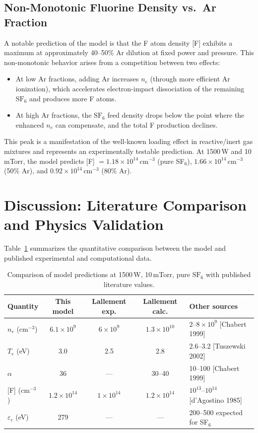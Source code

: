 \documentclass[11pt,a4paper]{article}
\newcommand{\SFsix}{\mathrm{SF}_6}
\newcommand{\Te}{T_e}
\newcommand{\nelec}{n_e}
\begin{document}
\subsection{Non-Monotonic Fluorine Density vs.\ Ar Fraction}

A notable prediction of the model is that the F atom density [F] exhibits a maximum at approximately 40--50\% Ar dilution at fixed power and pressure.  This non-monotonic behavior arises from a competition between two effects:
\begin{itemize}
\item At low Ar fractions, adding Ar increases $\nelec$ (through more efficient Ar ionization), which accelerates electron-impact dissociation of the remaining $\SFsix$ and produces more F atoms.
\item At high Ar fractions, the $\SFsix$ feed density drops below the point where the enhanced $\nelec$ can compensate, and the total F production declines.
\end{itemize}
This peak is a manifestation of the well-known loading effect in reactive/inert gas mixtures and represents an experimentally testable prediction.  At 1500\,W and 10\,mTorr, the model predicts [F] $= 1.18 \times 10^{14}$\,cm$^{-3}$ (pure SF$_6$), $1.66 \times 10^{14}$\,cm$^{-3}$ (50\% Ar), and $0.92 \times 10^{14}$\,cm$^{-3}$ (80\% Ar).

\section{Discussion: Literature Comparison and Physics Validation}
\label{sec:discussion}

Table~\ref{tab:comparison} summarizes the quantitative comparison between the model and published experimental and computational data.

\begin{table}[H]
\centering
\caption{Comparison of model predictions at 1500\,W, 10\,mTorr, pure $\SFsix$ with published literature values.}
\label{tab:comparison}
\small
\begin{tabular}{lcccl}
\toprule
Quantity & This model & Lallement exp. & Lallement calc. & Other sources \\
\midrule
$\nelec$ (cm$^{-3}$) & $6.1 \times 10^9$ & $6 \times 10^9$ & $1.3 \times 10^{10}$ & $2$--$8 \times 10^9$ [Chabert 1999] \\
$\Te$ (eV) & 3.0 & 2.5 & 2.8 & 2.6--3.2 [Tuszewski 2002] \\
$\alpha$ & 36 & --- & 30--40 & 10--100 [Chabert 1999] \\
{[F]} (cm$^{-3}$) & $1.2 \times 10^{14}$ & $1 \times 10^{14}$ & $1.2 \times 10^{14}$ & $10^{13}$--$10^{14}$ [d'Agostino 1985] \\
$\varepsilon_c$ (eV) & 279 & --- & --- & 200--500 expected for SF$_6$ \\
\bottomrule
\end{tabular}
\end{table}
\end{document}
